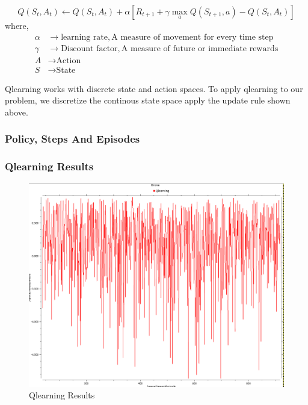 \documentclass[12pt]{article}
\begin{document}
\begin{equation}
  Q(S_t,A_t) \leftarrow Q(S_t,A_t) + \alpha[R_{t+1}+\gamma \max\limits_a Q(S_{t+1},a)- Q(S_t,A_t)]
\end{equation}
where, 
\begin{align}
  \alpha &\rightarrow  \text{learning rate}, \text{A measure of movement for every time step}     \nonumber  \\
  \gamma &\rightarrow  \text{Discount factor}, \text{A measure of  future or immediate rewards}  \nonumber \\
  A      &\rightarrow \text{Action}  \nonumber \\
  S      &\rightarrow \text{State} \nonumber
\end{align}

Qlearning works with discrete state and action spaces. To apply qlearning to our problem, we discretize the continous state space 
apply the update rule shown above.

\subsubsection{Policy, Steps  And Episodes}


\subsubsection{Qlearning Results}
\begin{figure}[h]
    \centering
    \includegraphics[width=12cm]{qlearn}
    \caption{Qlearning Results}
    \label{fig:3D environment created in matplotlib}
\end{figure}
\end{document}
